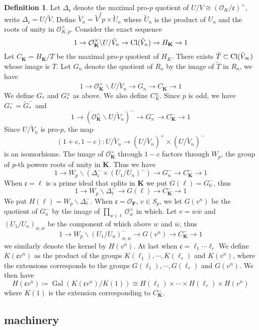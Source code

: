 \documentclass[leqno]{amsart}
\theoremstyle{definition}
\newtheorem{defn}[thm]{Definition}
\theoremstyle{remark}
\newcommand{\oo}{\mathcal{O}}
\DeclareMathOperator{\Gal}{Gal}
\newcommand{\fc}{\mathfrak{c}}
\newcommand{\F}{{\mathbf{F}}} %
\newcommand{\K}{{\mathbf{K}}} %
\newcommand{\bw}{\overline{w}}
\begin{document}
\begin{defn}
Let $\Delta_\fc$ denote
the maximal pro-$p$ quotient of 
$U/V\cong (\oo_K/\fc)^\times$,
write  $\Delta_\fc=U/\tilde{V}$.
Define $\tilde{V}_n=\tilde{V}^Ip\times \tilde{U}_n$
where $\tilde{U}_n$ is the product of $U_n$
and the roots of unity in  $\oo_{K,p}^\times$.
Consider the exact sequence
\[
	1\to \oo_\K^\times\backslash U/\tilde{V}_n
	\to \textnormal{Cl}(\tilde{V}_n)\to H_\K\to 1
\]
Let $C_\K=H_\K/T$ be the maximal pro-$p$ quotient
of $H_K$. There exists  
$ \tilde{T}\subset \textnormal{Cl}(\tilde{V}_\infty)$
whose image is $T$.
Let $G_n$ denote the quotient of  $R_n$
by the image of  $ \tilde{T}$ in $R_n$, we have
\[
	1\to \oo_\K^\times\backslash U/\tilde{V}_n
	\to G_n\to C_\K\to 1
\]
We define $G_*$ and  $G_*^{\pm}$ as above.
We also define $C_K^{\pm}$.
Since $p$ is odd, we have
$G_*^{-}=\tilde{G}_*^-$ and 
\[
	1\to (\oo_\K^\times\backslash U/\tilde{V}_n)^-
	\to G_n^-\to C_\K^-\to 1
\]
Since $U/\tilde{V}_n$ is pro-$p$, the map
\[
	 (1+c,1-c)\colon 
	 U/\tilde{V}_n\to 
	 (U/\tilde{V}_n)^+\times
	 (U/\tilde{V}_n)^-
\]
is an isomorhisms.
The image of $\oo_\K^\times$ through  $1-c$
factors through  $W_p$,
the group of $p$-th powers roots of unity in  $\K$.
Thus we have
\[
	1\to W_p\backslash (\Delta_\fc^-\times (U_1/U_n)^-)
	\to G_n^-\to C_\K^-\to 1
\]
When $\fc=\ell$ is a prime ideal that splits in  $\K$
we put  $G(\ell)=G_0^-$, thus
\[
	1\to W_p\backslash \Delta_\ell^-
	\to G(\ell)\to C_\K^-\to 1
\]
We put $H(\ell)=W_p\backslash \Delta_\ell^-$.
When  $\fc=\oo_\F$, $v\in S_p$,
we let $G(v^n)$ be the quotient 
of $G_n^-$ by the image of 
$\prod_{w\nmid \ell}\oo_w^\times$ in which.
Let $v=w\bw$ and 
$(U_1/U_n)_{w,\bw}$ be the component
of which above $w$ and  $\bw$, thus
\[
	1\to W_p\backslash (U_1/U_n)_{w,\bw}^-
	\to G(v^n)\to C_\K^-\to 1
\]
we similarly denote the kernel by $H(v^n)$.
At last
when  $\fc=\ell_1\cdots\ell_r$
We define $K(\fc v^n)$
as the product of the groups
$K(\ell_1),\cdots, K(\ell_r)$ and $K(v^n)$,
where the extensions corresponds
to the groups  $G(\ell_1),\cdots,G(\ell_r)$ and $G(v^n)$.
We then have 
\[
	H(\fc v^n)\coloneqq 
	\Gal(K(\fc v^n)/K(1))\cong 
	H(\ell_1)\times\cdots\times H(\ell_r)\times H(v^n)
\]
where $K(1)$ is the extension corresponding
to  $C_\K^-$.
\end{defn}



\subsection{machinery}
\end{document}

